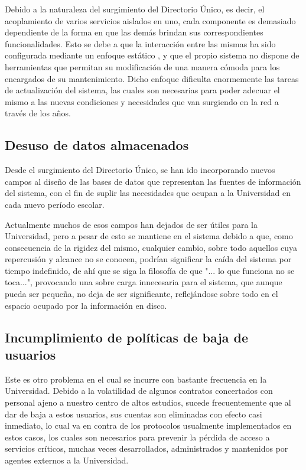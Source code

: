 Debido a la naturaleza del surgimiento del Directorio \'Unico, es decir, el acoplamiento de varios servicios aislados en uno, cada componente es demasiado dependiente de la forma en que las dem\'as brindan sus correspondientes funcionalidades. Esto se debe a que la interacci\'on entre las mismas ha sido configurada mediante un enfoque est\'atico , y que el propio sistema no dispone de herramientas que permitan su modificaci\'on de una manera c\'omoda para los encargados de su mantenimiento. Dicho enfoque dificulta enormemente las tareas de actualizaci\'on del sistema, las cuales son necesarias para poder adecuar el mismo a las nuevas condiciones y necesidades que van surgiendo en la red a trav\'es de los años.

\subsection{Desuso de datos almacenados}

Desde el surgimiento del Directorio \'Unico, se han ido incorporando nuevos campos al diseño de las bases de datos que representan las fuentes de informaci\'on del sistema, con el fin de suplir las necesidades que ocupan a la Universidad en cada nuevo per\'iodo escolar. 

Actualmente muchos de esos campos han dejados de ser \'utiles para la Universidad, pero a pesar de esto se mantiene en el sistema debido a que, como consecuencia de la rigidez del mismo, cualquier cambio, sobre todo aquellos cuya repercusi\'on y alcance no se conocen, podr\'ian significar la ca\'ida del sistema por tiempo indefinido, de ah\'i que se siga la filosof\'ia de que "... lo que funciona no se toca...", provocando una sobre carga innecesaria para el sistema, que aunque pueda ser pequeña, no deja de ser significante, reflej\'andose sobre todo en el espacio ocupado por la informaci\'on en disco.

\subsection{Incumplimiento de pol\'iticas de baja de usuarios}

Este es otro problema en el cual se incurre con bastante frecuencia en la Universidad. Debido a la volatilidad de algunos contratos concertados con personal ajeno a nuestro centro de altos estudios, sucede frecuentemente que al dar de baja a estos usuarios, sus cuentas son eliminadas con efecto casi inmediato, lo cual va en contra de los protocolos usualmente implementados en estos casos, los cuales son necesarios para prevenir la p\'erdida de acceso a servicios cr\'iticos, muchas veces desarrollados, administrados y mantenidos por agentes externos a la Universidad.		


